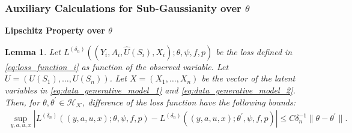 \documentclass[12pt]{article}
\newtheorem{lemma}{Lemma}%
\begin{document}
\subsubsection{Auxiliary Calculations for Sub-Gaussianity over $\theta$}

\noindent\textbf{Lipschitz Property over $\theta$}
\begin{lemma}\label{lemma:L_i_diff_theta}
    Let $L^{(\delta_n)}((Y_i,A_i,\widehat U(S_i),X_i);\theta,\psi,f,p)$ be the loss  defined in \eqref{eq:loss_function_i} as function of the observed variable. Let $U = (U(S_1),\ldots,U(S_n))$. Let $X = (X_1,\ldots,X_n)$ be the vector of the latent variables in \eqref{eq:data_generative_model_1} and \eqref{eq:data_generative_model_2}. Then, for $\theta,\theta^\prime\in \mathcal{H}_{\mathcal{K}}$, difference of the loss function have the following bounds:
    \begin{align*}
        \sup_{y,a,u,x}\left|L^{(\delta_n)}((y,a,u,x);\theta,\psi,f,p) - L^{(\delta_n)}((y,a,u,x);\theta^\prime,\psi,f,p)\right|\leq C\delta_n^{-1}\|\theta-\theta^\prime\|.
    \end{align*}
\end{lemma}
\end{document}
